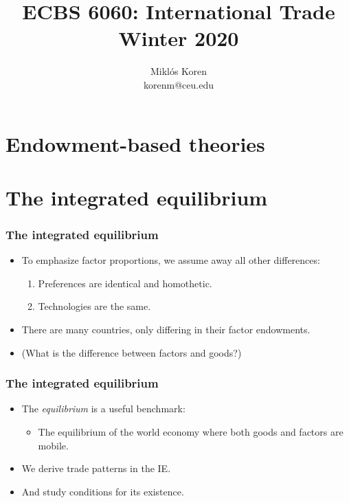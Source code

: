 \documentclass[compress,mathserif,aspectratio=169]{beamer}
\title{ECBS 6060: International Trade\\
Winter 2020}
\author{Mikl\'os Koren\\
korenm@ceu.edu}
\date %
{}
\begin{document}
\begin{frame}[plain]
  \titlepage
    \addtocounter{framenumber}{-1}
\end{frame}






\section{Endowment-based theories}\hypertarget{Endowment-based theories}{}






\section{The integrated equilibrium}\hypertarget{The integrated equilibrium}{}
\begin{frame}\frametitle{The integrated equilibrium}\hypertarget{The integrated equilibrium}{}
\begin{itemize}
\item To emphasize factor proportions, we assume away all other differences:
\begin{enumerate}\setcounter{enumi}{0}
\item Preferences are identical and homothetic.

\item Technologies are the same.
\end{enumerate}

\item There are many countries, only differing in their factor endowments.

\item (What is the difference between factors and goods?)


\end{itemize}
\end{frame}



\begin{frame}\frametitle{The integrated equilibrium}\hypertarget{The integrated equilibrium}{}
\begin{itemize}
\item The \emph{ equilibrium} is a useful benchmark:
\begin{itemize}
\item The equilibrium of the world economy where both goods and factors are mobile.
\end{itemize}

\item We derive trade patterns in the IE.

\item And study conditions for its existence.




\end{itemize}
\end{frame}
\end{document}
